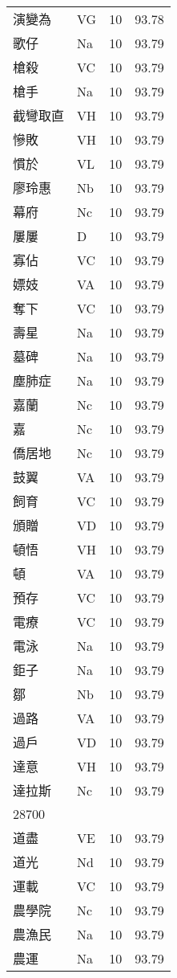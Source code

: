 \documentclass[twocolumn]{book}
\begin{document}
\begin{supertabular}{llrr}
演變為 & VG & 10 &  93.78\\
歌仔 & Na & 10 &  93.79\\
槍殺 & VC & 10 &  93.79\\
槍手 & Na & 10 &  93.79\\
截彎取直 & VH & 10 &  93.79\\
慘敗 & VH & 10 &  93.79\\
慣於 & VL & 10 &  93.79\\
廖玲惠 & Nb & 10 &  93.79\\
幕府 & Nc & 10 &  93.79\\
屢屢 & D & 10 &  93.79\\
寡佔 & VC & 10 &  93.79\\
嫖妓 & VA & 10 &  93.79\\
奪下 & VC & 10 &  93.79\\
壽星 & Na & 10 &  93.79\\
墓碑 & Na & 10 &  93.79\\
塵肺症 & Na & 10 &  93.79\\
嘉蘭 & Nc & 10 &  93.79\\
嘉 & Nc & 10 &  93.79\\
僑居地 & Nc & 10 &  93.79\\
鼓翼 & VA & 10 &  93.79\\
飼育 & VC & 10 &  93.79\\
頒贈 & VD & 10 &  93.79\\
頓悟 & VH & 10 &  93.79\\
頓 & VA & 10 &  93.79\\
預存 & VC & 10 &  93.79\\
電療 & VC & 10 &  93.79\\
電泳 & Na & 10 &  93.79\\
鉅子 & Na & 10 &  93.79\\
鄒 & Nb & 10 &  93.79\\
過路 & VA & 10 &  93.79\\
過戶 & VD & 10 &  93.79\\
達意 & VH & 10 &  93.79\\
達拉斯 & Nc & 10 &  93.79\\
28700\\
道盡 & VE & 10 &  93.79\\
道光 & Nd & 10 &  93.79\\
運載 & VC & 10 &  93.79\\
農學院 & Nc & 10 &  93.79\\
農漁民 & Na & 10 &  93.79\\
農運 & Na & 10 &  93.79\\

\end{supertabular}
\end{document}
